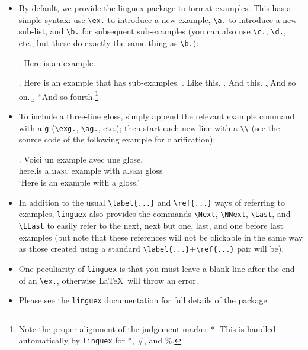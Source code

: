 \documentclass[linguex]{lfg-proc}
\begin{document}
\begin{itemize}
  \item By default, we provide the \href{https://ctan.org/pkg/linguex}{linguex}
  package to format examples. This has a simple syntax: use \verb=\ex.= to
  introduce a new example, \verb=\a.= to introduce a new sub-list, and
  \verb=\b.= for subsequent sub-examples (you can also use \verb=\c.=,
  \verb=\d.=, etc., but these do exactly the same thing as \verb=\b.=):

        \ex. Here is an example.

        \ex. Here is an example that has sub-examples.%
        \a. Like this.%
        \b. And this.%
        \c. And so on.%
        \b. *And so fourth.\footnote{Note the proper alignment of the judgement
        marker *. This is handled automatically by \texttt{linguex} for *, \#,
        and \%.}

  \item To include a three-line gloss, simply append the relevant example
        command with a \verb=g= (\verb=\exg.=, \verb=\ag.=, etc.); then
        start each new line with a \verb=\\= (see the source code of the
        following example for clarification):

        \exg.%
        Voici un example avec une glose.\\
        here.is a.\textsc{masc} example with a.\textsc{fem} gloss\\
        `Here is an example with a gloss.' 

  \item In addition to the usual \verb=\label{...}= and \verb=\ref{...}= ways of
        referring to examples, \verb=linguex= also provides the commands
        \verb=\Next=, \verb=\NNext=, \verb=\Last=, and \verb=\LLast= to easily
        refer to the next, next but one, last, and one before last examples (but
        note that these references will not be clickable in the same way as
        those created using a standard \verb=\label{...}=+\verb=\ref{...}= pair
        will be).

  \item One peculiarity of \verb=linguex= is that you must leave a blank line
        after the end of an \verb=\ex.=, otherwise \LaTeX\ will throw an error.

  \item Please see
        \href{https://ctan.uib.no/macros/latex/contrib/linguex/doc/linguex-doc.pdf}{the
        \texttt{linguex} documentation} for full details of the package.


\end{itemize}
\end{document}
